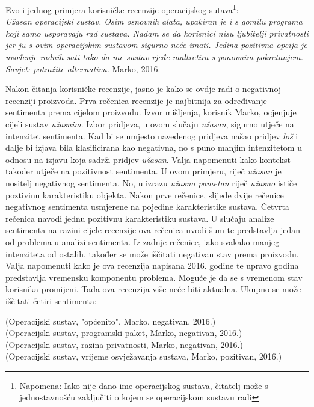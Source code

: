 \documentclass[times, utf8, zavrsni, numeric]{fer}
\begin{document}
\par Evo i jednog primjera korisničke recenzije operacijskog sutava\footnote{Napomena: 
Iako nije dano ime operacijskog sustava, čitatelj može s jednostavnošću
zaključiti o kojem se operacijskom sustavu radi}: \\
{\it
Užasan operacijski sustav. 
Osim osnovnih alata, upakiran je i s gomilu programa koji samo usporavaju rad sustava.
Nadam se da korisnici nisu ljubitelji privatnosti jer ju s ovim operacijskim sustavom
sigurno neće imati. 
Jedina pozitivna opcija je uvođenje radnih sati tako da me sustav rjeđe maltretira s 
ponovnim pokretanjem.
Savjet: potražite alternativu.
} Marko, 2016.
\par Nakon čitanja korisničke recenzije, jasno je kako se ovdje radi o negativnoj recenziji
proizvoda.
Prva rečenica recenzije je najbitnija za određivanje sentimenta prema cijelom proizvodu.
Izvor mišljenja, korisnik Marko, ocjenjuje cijeli sustav \textit{užasnim}.
Izbor pridjeva, u ovom slučaju \textit{užasan}, sigurno utječe na intenzitet sentimenta. 
Kad bi se umjesto navedenog pridjeva našao pridjev \textit{loš} i dalje bi izjava bila
klasificirana kao negativna, no s puno manjim intenzitetom u odnosu na izjavu koja sadrži pridjev 
\textit{užasan}.
Valja napomenuti kako kontekst također utječe na pozitivnost sentimenta.
U ovom primjeru, riječ \textit{užasan} je nositelj negativnog sentimenta. 
No, u izrazu \textit{užasno pametan} riječ \textit{užasno} ističe poztivinu karakteristiku objekta.
Nakon prve rečenice, slijede dvije rečenice negativnog sentimenta usmjerene na pojedine karakteristike
sustava. Četvrta rečenica navodi jednu pozitivnu karakteristiku sustava.
U slučaju analize sentimenta na razini cijele recenzije ova rečenica uvodi šum te predstavlja jedan od
problema u analizi sentimenta. 
Iz zadnje rečenice, iako svakako manjeg intenziteta od ostalih, također se može iščitati negativan 
stav prema proizvodu. Valja napomenuti kako je ova recenzija napisana 2016. godine te upravo godina 
predstavlja vremensku komponentu problema. Moguće je da se s vremenom stav korisnika promijeni.
Tada ova recenzija više neće biti aktualna. Ukupno se može iščitati četiri sentimenta: 
\begin{center}
(Operacijski sustav, "općenito", Marko, negativan, 2016.)\\
(Operacijski sustav, programski paket, Marko, negativan, 2016.)\\
(Operacijski sustav, razina privatnosti, Marko, negativan, 2016.)\\
(Operacijski sustav, vrijeme osvježavanja sustava, Marko, pozitivan, 2016.) \\
\end{center}
\end{document}
